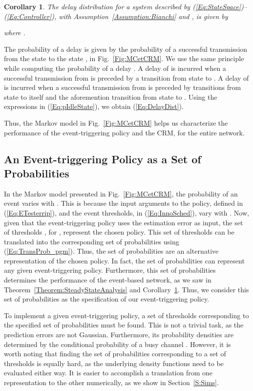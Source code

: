 \documentclass[journal]{IEEEtran}
\newtheorem{corollary}[theorem]{Corollary}
\begin{document}
\begin{corollary} \label{Corollary:DelayDist}
The delay distribution for a system described by (\ref{Eq:StateSpace})--(\ref{Eq:Controller}), with Assumption~\ref{Assumption:Bianchi} and , is given by

where .
\end{corollary}
\begin{IEEEproof}
The probability of a delay  is given by the probability of a successful transmission from the state  to the state , in Fig.~\ref{Fig:MCetCRM}. We use the same principle while computing the probability of a delay . A delay of  is incurred when a successful transmission from  is preceded by a transition from state  to . A delay of  is incurred when a successful transmission from  is preceded by  transitions from state  to itself and the aforemention transition from state  to . Using the expressions in (\ref{Eq:pIdleState}), we obtain (\ref{Eq:DelayDist}).
\end{IEEEproof}

Thus, the Markov model in Fig.~\ref{Fig:MCetCRM} helps us characterize the performance of the event-triggering policy and the CRM, for the entire network.

\subsection{An Event-triggering Policy as a Set of Probabilities}

In the Markov model presented in Fig.~\ref{Fig:MCetCRM}, the probability of an event  varies with . This is because the input arguments to the policy, defined in (\ref{Eq:ETesterrip}), and the event thresholds,  in (\ref{Eq:InnoSched}), vary with . Now, given that the event-triggering policy uses the estimation error as input, the set of thresholds , for , represent the chosen policy. This set of thresholds can be translated into the corresponding set of probabilities  using (\ref{Eq:TransProb_pgm}). Thus, the set of probabilities are an alternative representation of the chosen policy. In fact, the set of probabilities can represent any given event-triggering policy. Furthermore, this set of probabilities determines the performance of the event-based network, as we saw in Theorem~\ref{Theorem:SteadyStateAnalysis} and Corollary~\ref{Corollary:DelayDist}. Thus, we consider this set of probabilities as the specification of our event-triggering policy.

To implement a given event-triggering policy, a set of thresholds corresponding to the specified set of probabilities must be found. This is not a trivial task, as the prediction errors are not Gaussian. Furthermore, its probability densities are determined by the conditional probability of a busy channel . However, it is worth noting that finding the set of probabilities corresponding to a set of thresholds is equally hard, as the underlying density functions need to be evaluated either way. It is easier to accomplish a translation from one representation to the other numerically, as we show in Section~\ref{S:Sims}.
\end{document}

